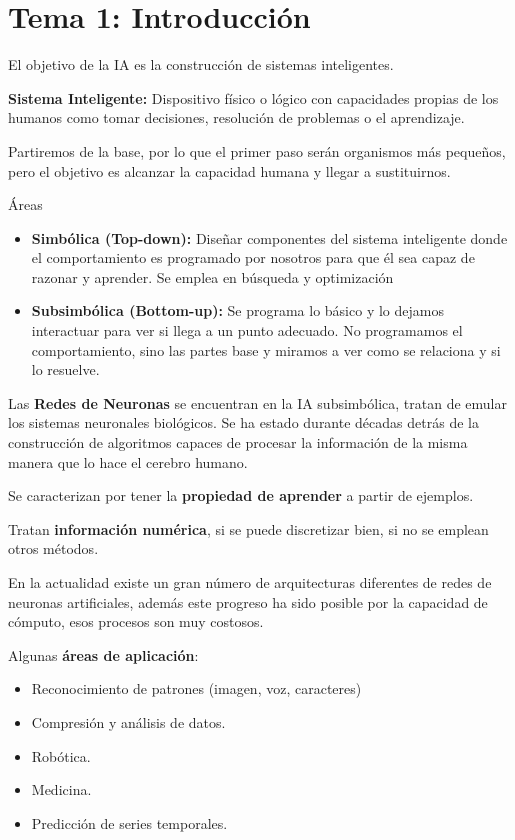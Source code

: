 \documentclass[12pt, twoside, openright]{report} %
\begin{document}
\chapter{Tema 1: Introducción}
El objetivo de la IA es la construcción de sistemas inteligentes.

\textbf{Sistema Inteligente:} Dispositivo físico o lógico con capacidades propias de los humanos como tomar decisiones, resolución de problemas o el aprendizaje.

Partiremos de la base, por lo que el primer paso serán organismos más pequeños, pero el objetivo es alcanzar la capacidad humana y llegar a sustituirnos.

Áreas
\begin{itemize}
	\item \textbf{Simbólica (Top-down):} Diseñar componentes del sistema inteligente donde el comportamiento es programado por nosotros para que él sea capaz de razonar y aprender. Se emplea en búsqueda y optimización
	\item \textbf{Subsimbólica (Bottom-up):} Se programa lo básico y lo dejamos interactuar para ver si llega a un punto adecuado. No programamos el comportamiento, sino las partes base y miramos a ver como se relaciona y si lo resuelve.
\end{itemize}

Las \textbf{Redes de Neuronas} se encuentran en la IA subsimbólica, tratan de emular los sistemas neuronales biológicos. Se ha estado durante décadas detrás de la construcción de algoritmos capaces de procesar la información de la misma manera que lo hace el cerebro humano.

Se caracterizan por tener la \textbf{propiedad de aprender} a partir de ejemplos.

Tratan \textbf{información numérica}, si se puede discretizar bien, si no se emplean otros métodos.

En la actualidad existe un gran número de arquitecturas diferentes de redes de neuronas artificiales, además este progreso ha sido posible por la capacidad de cómputo, esos procesos son muy costosos.

Algunas \textbf{áreas de aplicación}:
\begin{itemize}
	\item Reconocimiento de patrones (imagen, voz, caracteres)
	\item Compresión y análisis de datos.
	\item Robótica.
	\item Medicina.
	\item Predicción de series temporales.
\end{itemize}
\end{document}
